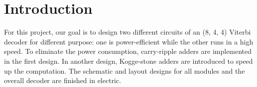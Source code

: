 \documentclass[conference]{IEEEtran}
\begin{document}
\begin{abstract}
This paper presents the basic knowledge and circuit design for an (8, 4, 4) Viterbi decoder. Two different designs are given to optimize either computation speed or power consumption. The decoder architecture is verified by logic simulation in Modelsim with verilog. Timing analysis and circuit simulation in SPICE are done to find the computation delay and the amount of power consumed for both designs. The repository and \LaTeX\  code for this report can be accessed by visiting: \url{https://github.com/xiaoqing1993/ECSE548_viterbi_decoder}

\end{abstract}







%
\IEEEpeerreviewmaketitle



\section{Introduction}
For this project, our goal is to design two different circuits of an (8, 4, 4) Viterbi decoder for different purpose: one is power-efficient while the other runs in a high speed. To eliminate the power consumption, carry-ripple adders are implemented in the first design. In another design, Kogge-stone adders are introduced to speed up the computation. The schematic and layout designs for all modules and the overall decoder are finished in electric.
\end{document}
